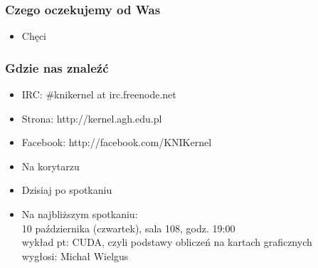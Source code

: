\documentclass[10pt]{beamer}
\begin{document}
\begin{frame}
	\frametitle{Czego oczekujemy od Was}
	\begin{itemize}
		\item<2->Chęci
	\end{itemize}
\end{frame}
\begin{frame}
	\frametitle{Gdzie nas znaleźć}
	\begin{itemize}
		\item<2->IRC: \#knikernel at irc.freenode.net
		\item<3->Strona: http://kernel.agh.edu.pl
		\item<4->Facebook: http://facebook.com/KNIKernel
		\item<5->Na korytarzu
		\item<6->Dzisiaj po spotkaniu
		\item<7->Na najbliższym spotkaniu:\\
		10 października (czwartek), sala 108, godz. 19:00\\
		wykład pt: CUDA, czyli podstawy obliczeń na kartach graficznych\\
		wygłosi: Michał Wielgus
	\end{itemize}
\end{frame}
\end{document}
